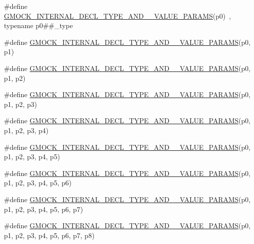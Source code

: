 \begin{DoxyCompactItemize}
\item 
\#define \hyperlink{gmock-generated-actions_8h_a462396713d8024e37a66fb12abd87a00}{G\+M\+O\+C\+K\+\_\+\+I\+N\+T\+E\+R\+N\+A\+L\+\_\+\+D\+E\+C\+L\+\_\+\+T\+Y\+P\+E\+\_\+\+A\+N\+D\+\_\+\_\+\+V\+A\+L\+U\+E\+\_\+\+P\+A\+R\+A\+MS}(p0)~, typename p0\#\#\+\_\+type
\item 
\#define \hyperlink{gmock-generated-actions_8h_a8de8a9ba55313f4f4ba936c28ffe0d93}{G\+M\+O\+C\+K\+\_\+\+I\+N\+T\+E\+R\+N\+A\+L\+\_\+\+D\+E\+C\+L\+\_\+\+T\+Y\+P\+E\+\_\+\+A\+N\+D\+\_\+\_\+\+V\+A\+L\+U\+E\+\_\+\+P\+A\+R\+A\+MS}(p0,  p1)
\item 
\#define \hyperlink{gmock-generated-actions_8h_a2def1ab63696280e9b8c20ed176d0c92}{G\+M\+O\+C\+K\+\_\+\+I\+N\+T\+E\+R\+N\+A\+L\+\_\+\+D\+E\+C\+L\+\_\+\+T\+Y\+P\+E\+\_\+\+A\+N\+D\+\_\+\_\+\+V\+A\+L\+U\+E\+\_\+\+P\+A\+R\+A\+MS}(p0,  p1,  p2)
\item 
\#define \hyperlink{gmock-generated-actions_8h_aff64ba07ea8171eb7bacb655127120f7}{G\+M\+O\+C\+K\+\_\+\+I\+N\+T\+E\+R\+N\+A\+L\+\_\+\+D\+E\+C\+L\+\_\+\+T\+Y\+P\+E\+\_\+\+A\+N\+D\+\_\+\_\+\+V\+A\+L\+U\+E\+\_\+\+P\+A\+R\+A\+MS}(p0,  p1,  p2,  p3)
\item 
\#define \hyperlink{gmock-generated-actions_8h_a1f0b43fe98dabf52fa9dbffa0966d7f3}{G\+M\+O\+C\+K\+\_\+\+I\+N\+T\+E\+R\+N\+A\+L\+\_\+\+D\+E\+C\+L\+\_\+\+T\+Y\+P\+E\+\_\+\+A\+N\+D\+\_\+\_\+\+V\+A\+L\+U\+E\+\_\+\+P\+A\+R\+A\+MS}(p0,  p1,  p2,  p3,  p4)
\item 
\#define \hyperlink{gmock-generated-actions_8h_abffe20cc195c1f2a1682878bb7f7a35d}{G\+M\+O\+C\+K\+\_\+\+I\+N\+T\+E\+R\+N\+A\+L\+\_\+\+D\+E\+C\+L\+\_\+\+T\+Y\+P\+E\+\_\+\+A\+N\+D\+\_\+\_\+\+V\+A\+L\+U\+E\+\_\+\+P\+A\+R\+A\+MS}(p0,  p1,  p2,  p3,  p4,  p5)
\item 
\#define \hyperlink{gmock-generated-actions_8h_acb3b2a137310a0ac944d3695a0911a64}{G\+M\+O\+C\+K\+\_\+\+I\+N\+T\+E\+R\+N\+A\+L\+\_\+\+D\+E\+C\+L\+\_\+\+T\+Y\+P\+E\+\_\+\+A\+N\+D\+\_\+\_\+\+V\+A\+L\+U\+E\+\_\+\+P\+A\+R\+A\+MS}(p0,  p1,  p2,  p3,  p4,  p5,  p6)
\item 
\#define \hyperlink{gmock-generated-actions_8h_af6338728a5c12281280830ec7c5f685a}{G\+M\+O\+C\+K\+\_\+\+I\+N\+T\+E\+R\+N\+A\+L\+\_\+\+D\+E\+C\+L\+\_\+\+T\+Y\+P\+E\+\_\+\+A\+N\+D\+\_\+\_\+\+V\+A\+L\+U\+E\+\_\+\+P\+A\+R\+A\+MS}(p0,  p1,  p2,  p3,  p4,  p5,  p6,  p7)
\item 
\#define \hyperlink{gmock-generated-actions_8h_a27e84307ea95be9e2e4526cd6b34a151}{G\+M\+O\+C\+K\+\_\+\+I\+N\+T\+E\+R\+N\+A\+L\+\_\+\+D\+E\+C\+L\+\_\+\+T\+Y\+P\+E\+\_\+\+A\+N\+D\+\_\+\_\+\+V\+A\+L\+U\+E\+\_\+\+P\+A\+R\+A\+MS}(p0,  p1,  p2,  p3,  p4,  p5,  p6,  p7,  p8)

\end{DoxyCompactItemize}
